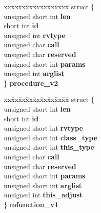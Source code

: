 \begin{DoxyCompactItemize}
\begin{tabbing}
\end{tabbing}\item 
\mbox{\label{unioncodeview__type_a19e6588fc1d2d4a86b4077ae18a75984}} 
\begin{tabbing}
xx\=xx\=xx\=xx\=xx\=xx\=xx\=xx\=xx\=\kill
struct \{\\
\>unsigned short int {\bfseries len}\\
\>short int {\bfseries id}\\
\>unsigned int {\bfseries rvtype}\\
\>unsigned char {\bfseries call}\\
\>unsigned char {\bfseries reserved}\\
\>unsigned short int {\bfseries params}\\
\>unsigned int {\bfseries arglist}\\
\} {\bfseries procedure\_v2}\\

\end{tabbing}\item 
\mbox{\label{unioncodeview__type_a9bb7bfa580ffb0130fa8c077ecf7ad22}} 
\begin{tabbing}
xx\=xx\=xx\=xx\=xx\=xx\=xx\=xx\=xx\=\kill
struct \{\\
\>unsigned short int {\bfseries len}\\
\>short int {\bfseries id}\\
\>unsigned short int {\bfseries rvtype}\\
\>unsigned short int {\bfseries class\_type}\\
\>unsigned short int {\bfseries this\_type}\\
\>unsigned char {\bfseries call}\\
\>unsigned char {\bfseries reserved}\\
\>unsigned short int {\bfseries params}\\
\>unsigned short int {\bfseries arglist}\\
\>unsigned int {\bfseries this\_adjust}\\
\} {\bfseries mfunction\_v1}\\


\end{tabbing}
\end{DoxyCompactItemize}
